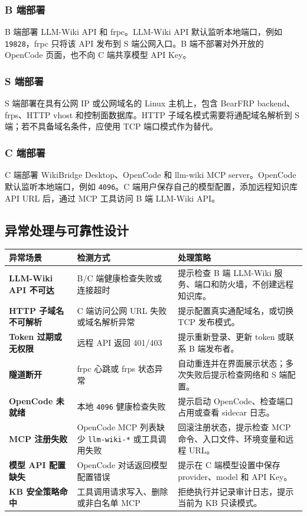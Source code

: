 \documentclass[UTF8,a4paper,12pt,fontset=fandol]{ctexart}
\newcommand{\code}[1]{\texttt{\footnotesize #1}}
\begin{document}
\subsubsection{B 端部署}
B 端部署 LLM-Wiki API 和 frpc。LLM-Wiki API 默认监听本地端口，例如 \code{19828}，frpc 只将该 API 发布到 S 端公网入口。B 端不部署对外开放的 OpenCode 页面，也不向 C 端共享模型 API Key。

\subsubsection{S 端部署}
S 端部署在具有公网 IP 或公网域名的 Linux 主机上，包含 BearFRP backend、frps、HTTP vhost 和控制面数据库。HTTP 子域名模式需要将通配域名解析到 S 端；若不具备域名条件，应使用 TCP 端口模式作为替代。

\subsubsection{C 端部署}
C 端部署 WikiBridge Desktop、OpenCode 和 llm-wiki MCP server。OpenCode 默认监听本地端口，例如 \code{4096}。C 端用户保存自己的模型配置，添加远程知识库 API URL 后，通过 MCP 工具访问 B 端 LLM-Wiki API。

\subsection{异常处理与可靠性设计}
\begin{longtable}{>{\bfseries}p{3.3cm}p{5.0cm}p{5.8cm}}
\toprule
异常场景 & 检测方式 & 处理策略 \\
\midrule
LLM-Wiki API 不可达 & B/C 端健康检查失败或连接超时 & 提示检查 B 端 LLM-Wiki 服务、端口和防火墙，不创建远程知识库。 \\
HTTP 子域名不可解析 & C 端访问公网 URL 失败或域名解析异常 & 提示配置真实通配域名，或切换 TCP 发布模式。 \\
Token 过期或无权限 & 远程 API 返回 401/403 & 提示重新登录、更新 token 或联系 B 端发布者。 \\
隧道断开 & frpc 心跳或 frps 状态异常 & 自动重连并在界面展示状态；多次失败后提示检查网络和 S 端配置。 \\
OpenCode 未就绪 & 本地 \code{4096} 健康检查失败 & 提示启动 OpenCode、检查端口占用或查看 sidecar 日志。 \\
MCP 注册失败 & OpenCode MCP 列表缺少 \code{llm-wiki-*} 或工具调用失败 & 回滚注册状态，提示检查 MCP 命令、入口文件、环境变量和远程 URL。 \\
模型 API 配置缺失 & OpenCode 对话返回模型配置错误 & 提示在 C 端模型设置中保存 provider、model 和 API Key。 \\
KB 安全策略命中 & 工具调用请求写入、删除或非白名单 MCP & 拒绝执行并记录审计日志，提示当前为 KB 只读模式。 \\
\bottomrule
\end{longtable}
\end{document}

